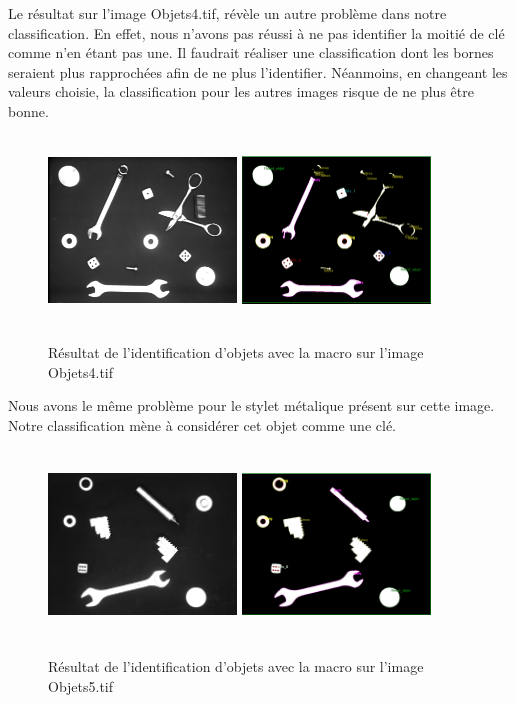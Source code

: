 \documentclass{scrreprt}
\begin{document}
Le résultat sur l'image Objets4.tif, révèle un autre problème dans notre classification.
En effet, nous n'avons pas réussi à ne pas identifier la moitié de clé comme n'en étant 
pas une. Il faudrait réaliser une classification dont les bornes seraient plus rapprochées 
afin de ne plus l'identifier. Néanmoins, en changeant les valeurs choisie, la classification
pour les autres images risque de ne plus être bonne. 
\begin{figure}[!h]
\centering
\includegraphics[width=5cm, height=5cm]{images/objet4o.png}\hfill
\includegraphics[width=5cm, height=5cm]{images/objet4.png}
\caption{Résultat de l'identification d'objets avec la macro sur l'image Objets4.tif}
\end{figure}

\newpage
Nous avons le même problème pour le stylet métalique présent sur cette image. 
Notre classification mène à considérer cet objet comme une clé. 
\begin{figure}[!h]
\centering
\includegraphics[width=5cm, height=5cm]{images/objet5o.png}\hfill
\includegraphics[width=5cm, height=5cm]{images/objet5.png}
\caption{Résultat de l'identification d'objets avec la macro sur l'image Objets5.tif}
\end{figure}
\end{document}
